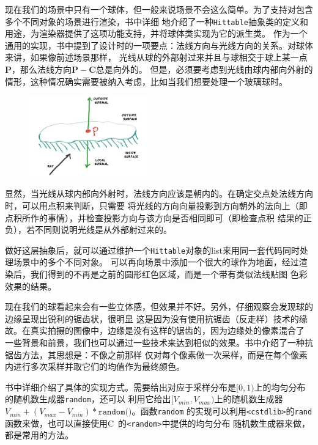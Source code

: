 \documentclass[12pt]{article}
\newcommand{\CC}{C\nolinebreak\hspace{-.05em}\raisebox{.4ex}{\tiny\bf +}%
\nolinebreak\hspace{-.10em}\raisebox{.4ex}{\tiny\bf +}}
\begin{document}
\indent{}现在我们的场景中只有一个球体，但一般来说场景不会这么简单。为了支持对包含多个不同对象的场景进行渲染，书中详细
地介绍了一种\texttt{Hittable}抽象类的定义和用途，为渲染器提供了这项功能支持，并将球体类实现为它的派生类。
作为一个通用的实现，书中提到了设计时的一项要点：法线方向与光线方向的关系。对球体来讲，如果像前述场景那样，
光线从球的外部射过来并且与球相交于球上某一点$\mathbf{P}$，那么法线方向$\mathbf{P}-\mathbf{C}$总是向外的。
但是，必须要考虑到光线由球内部向外射的情形，这种情况确实需要被纳入考虑，比如当我们想要处理一个玻璃球时。
\begin{figure}[h]
\centering
\includegraphics[width=0.45\textwidth]{./imgs/fig-1.06-normal-sides.jpg}
\end{figure}

\indent{}显然，当光线从球内部向外射时，法线方向应该是朝内的。在确定交点处法线方向时，可以用点积来判断，只需要
将光线的方向向量投影到方向朝外的法向上（即点积所作的事情），并检查投影方向与该方向是否相同即可（即检查点积
结果的正负），若不同则说明光线是从外部射过来的。

\indent{}做好这层抽象后，就可以通过维护一个\texttt{Hittable}对象的list来用同一套代码同时处理场景中的多个不同对象。
可以再向场景中添加一个很大的球作为地面，经过渲染后，我们得到的不再是之前的圆形红色区域，而是一个带有类似法线贴图
色彩效果的结果。

\indent{}现在我们的球看起来会有一些立体感，但效果并不好。另外，仔细观察会发现球的边缘呈现出锐利的锯齿状，很明显
这是因为没有使用抗锯齿（反走样）技术的缘故。在真实拍摄的图像中，边缘是没有这样的锯齿的，因为边缘处的像素混合了
一些背景和前景，我们也可以通过一些技术来达到相似的效果。书中介绍了一种抗锯齿方法，其思想是：不像之前那样
仅对每个像素做一次采样，而是在每个像素内进行多次采样并取它们的均值作为最终颜色。

\indent{}书中详细介绍了具体的实现方式。需要给出对应于采样分布是$[0,1)$上的均匀分布的随机数生成器\texttt{random}，还可以
利用它给出$[V_{min},V_{max})$上的随机数生成器$V_{min} + (V_{max} - V_{min}) * \texttt{random()}$。函数\texttt{random}
的实现可以利用\texttt{<cstdlib>}的\texttt{rand}函数来做，也可以直接使用{\CC}\,的\texttt{<random>}中提供的均匀分布
随机数生成器来做，都是常用的方法。
\end{document}
